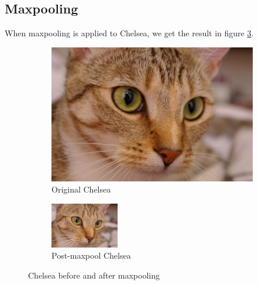 \documentclass[]{article}
\begin{document}
\subsection{Maxpooling}
When maxpooling is applied to Chelsea, we get the result in figure \ref{fig:chelsea}.
\begin{figure}[H]
     \centering
     \begin{subfigure}[b]{0.6\textwidth}
         \centering
         \includegraphics[width=\textwidth]{chelsea}
         \caption{Original Chelsea}
         \label{fig:chelsea_before}
     \end{subfigure}
     \hfill
     \begin{subfigure}[b]{0.3\textwidth}
         \centering
         \includegraphics[width=\textwidth]{chelsea_maxpooled}
         \caption{Post-maxpool Chelsea}
         \label{fig:chelsea_after}
     \end{subfigure}
    \caption{Chelsea before and after maxpooling}
    \label{fig:chelsea}
\end{figure}
\end{document}
